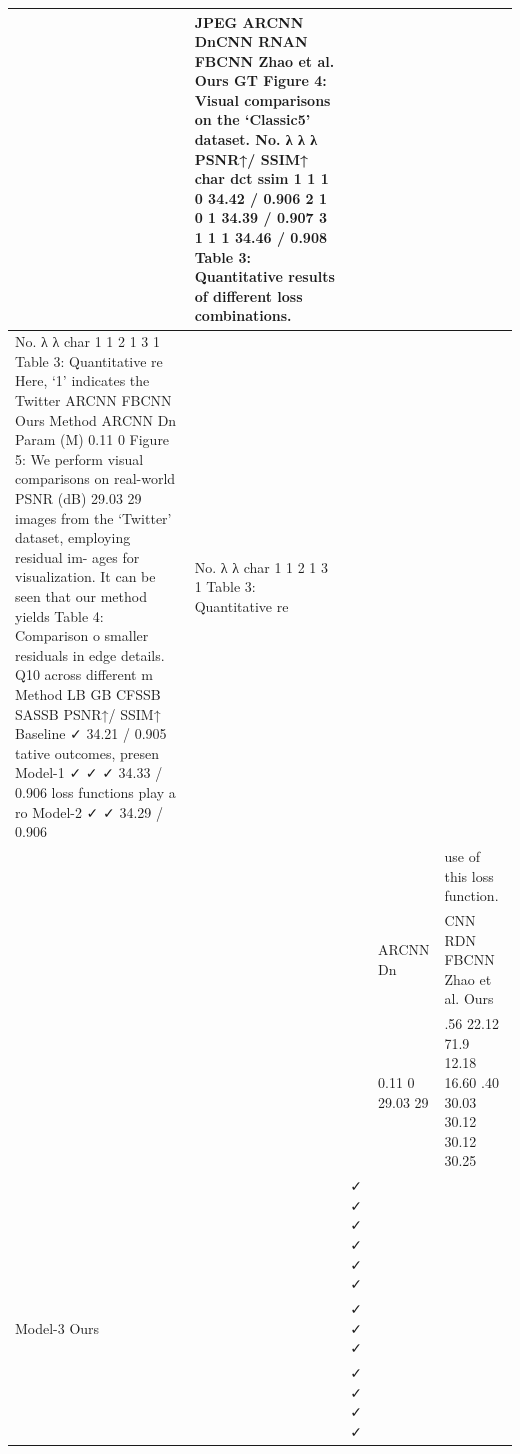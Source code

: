 \begin{tabular}{lllll}
\toprule
 & JPEG ARCNN DnCNN RNAN FBCNN Zhao et al. Ours GT Figure 4: Visual comparisons on the ‘Classic5’ dataset. No. λ λ λ PSNR↑/ SSIM↑ char dct ssim 1 1 1 0 34.42 / 0.906 2 1 0 1 34.39 / 0.907 3 1 1 1 34.46 / 0.908 Table 3: Quantitative results of different loss combinations. &  &  &  \\
\midrule
No. λ λ char 1 1 2 1 3 1 Table 3: Quantitative re Here, ‘1’ indicates the Twitter ARCNN FBCNN Ours Method ARCNN Dn Param (M) 0.11 0 Figure 5: We perform visual comparisons on real-world PSNR (dB) 29.03 29 images from the ‘Twitter’ dataset, employing residual im- ages for visualization. It can be seen that our method yields Table 4: Comparison o smaller residuals in edge details. Q10 across different m Method LB GB CFSSB SASSB PSNR↑/ SSIM↑ Baseline ✓ 34.21 / 0.905 tative outcomes, presen Model-1 ✓ ✓ ✓ 34.33 / 0.906 loss functions play a ro Model-2 ✓ ✓ 34.29 / 0.906 & No. λ λ char 1 1 2 1 3 1 Table 3: Quantitative re &  &  &  \\
 &  &  &  & use of this loss function. \\
 &  &  & ARCNN Dn & CNN RDN FBCNN Zhao et al. Ours \\
 &  &  & 0.11 0 29.03 29 & .56 22.12 71.9 12.18 16.60 .40 30.03 30.12 30.12 30.25 \\
 &  & ✓ ✓ ✓ ✓ ✓ ✓ &  &  \\
Model-3 Ours &  & ✓ ✓ ✓ &  &  \\
 &  & ✓ ✓ ✓ ✓ &  &  \\
\bottomrule
\end{tabular}
